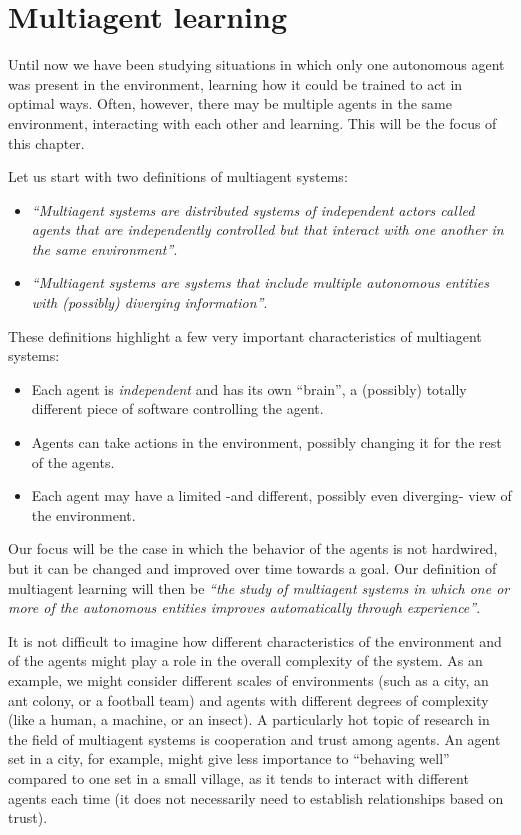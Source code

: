 \chapter{Multiagent learning}
Until now we have been studying situations in which only one autonomous agent was present in the environment, learning how it could be trained to act in optimal ways. Often, however, there may be multiple agents in the same environment, interacting with each other and learning. This will be the focus of this chapter.

Let us start with two definitions of multiagent systems:

\begin{itemize}
    \item \textit{``Multiagent systems are distributed systems of independent actors called agents that are independently controlled but that interact with one another in the same environment''}. \cite{wooldridge02} \cite{10.1007/978-3-030-01713-2_1}
    \item \textit{``Multiagent systems are systems that include multiple autonomous entities with (possibly) diverging information''}. \cite{ShohamLeytonBrown09}
\end{itemize}

These definitions highlight a few very important characteristics of multiagent systems:

\begin{itemize}
    \item Each agent is \textit{independent} and has its own ``brain'', a (possibly) totally different piece of software controlling the agent.
    \item Agents can take actions in the environment, possibly changing it for the rest of the agents.
    \item Each agent may have a limited -and different, possibly even diverging- view of the environment.
\end{itemize}

Our focus will be the case in which the behavior of the agents is not hardwired, but it can be changed and improved over time towards a goal. Our definition of multiagent learning will then be \textit{``the study of multiagent systems in which one or more of the autonomous entities improves automatically through experience''}.

It is not difficult to imagine how different characteristics of the environment and of the agents might play a role in the overall complexity of the system. As an example, we might consider different scales of environments (such as a city, an ant colony, or a football team) and agents with different degrees of complexity (like a human, a machine, or an insect). A particularly hot topic of research in the field of multiagent systems is cooperation and trust among agents. An agent set in a city, for example, might give less importance to ``behaving well'' compared to one set in a small village, as it tends to interact with different agents each time (it does not necessarily need to establish relationships based on trust).

